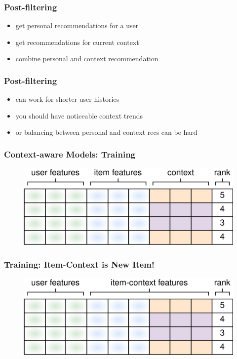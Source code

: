 \documentclass[t]{beamer}
\begin{document}
\begin{frame}
  \frametitle{Post-filtering}
  \begin{itemize}
  \item get personal recommendations for a user
  \item get recommendations for current context
  \item combine personal and context recommendation
  \end{itemize}
\end{frame}
\begin{frame}
  \frametitle{Post-filtering}
  \begin{itemize}
  \item can work for shorter user histories
  \item you should have noticeable context trends
  \item or balancing between personal and context recs can be hard
  \end{itemize}
\end{frame}
\begin{frame}
  \frametitle{Context-aware Models: Training}
  \begin{figure}
  \includegraphics[scale=0.25]{context-aware-1}
  \end{figure}
\end{frame}
\begin{frame}
  \frametitle{Training: Item-Context is New Item!}
  \begin{figure}
  \includegraphics[scale=0.25]{context-aware-2}
  \end{figure}
\end{frame}
\end{document}
